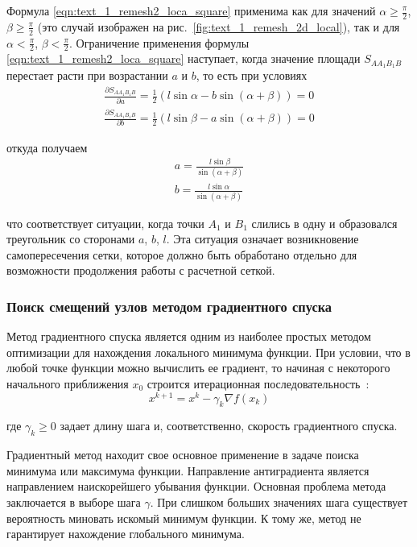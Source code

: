 Формула \eqref{eqn:text_1_remesh2_loca_square} применима как для значений $\alpha \ge \frac{\pi}{2}$, $\beta \ge \frac{\pi}{2}$ (это случай изображен на рис.~\ref{fig:text_1_remesh_2d_local}), так и для $\alpha < \frac{\pi}{2}$, $\beta < \frac{\pi}{2}$.
Ограничение применения формулы \eqref{eqn:text_1_remesh2_loca_square} наступает, когда значение площади $S_{AA_1B_1B}$ перестает расти при возрастании $a$ и $b$, то есть при условиях
\begin{equation}
	\begin{aligned}
		\frac{\partial S_{AA_1B_1B}}{\partial a} = \frac{1}{2}(l \sin \alpha - b \sin (\alpha + \beta)) = 0 \\
		\frac{\partial S_{AA_1B_1B}}{\partial b} = \frac{1}{2}(l \sin \beta - a \sin (\alpha + \beta)) = 0
	\end{aligned}
\end{equation}

откуда получаем
\begin{equation}
	\begin{aligned}
		a = \frac{l \sin \beta}{\sin (\alpha + \beta)} \\
		b = \frac{l \sin \alpha}{\sin (\alpha + \beta)}
	\end{aligned}
\end{equation}

что соответствует ситуации, когда точки $A_1$ и $B_1$ слились в одну и образовался треугольник со сторонами $a$, $b$, $l$.
Эта ситуация означает возникновение самопересечения сетки, которое должно быть обработано отдельно для возможности продолжения работы с расчетной сеткой.

\subsubsection{Поиск смещений узлов методом градиентного спуска}

Метод градиентного спуска является одним из наиболее простых методом оптимизации для нахождения локального минимума функции.
При условии, что в любой точке функции можно вычислить ее градиент, то начиная с некоторого начального приближения $x_0$ строится итерационная последовательность~\cite{Kantorovich1984Func}:
\begin{equation}
x^{k+1} = x^k - \gamma_k \nabla f(x_k)
\end{equation}

где $\gamma_k \ge 0$ задает длину шага и, соответственно, скорость градиентного спуска.

Градиентный метод находит свое основное применение в задаче поиска минимума или максимума функции.
Направление антиградиента является направлением наискорейшего убывания функции.
Основная проблема метода заключается в выборе шага $\gamma$.
При слишком больших значениях шага существует вероятность миновать искомый минимум функции.
К тому же, метод не гарантирует нахождение глобального минимума.

